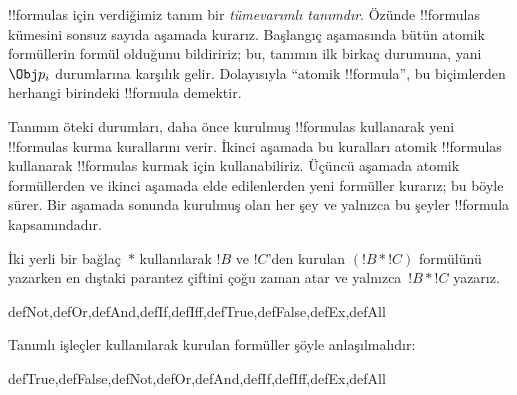 \documentclass[../../../include/open-logic-section]{subfiles}
\begin{document}
\begin{explain}
!!{formula}s için verdiğimiz tanım bir
\emph{tümevarımlı tanımdır}. Özünde !!{formula}s kümesini sonsuz sayıda
aşamada kurarız. Başlangıç aşamasında bütün atomik formüllerin formül
olduğunu bildiririz; bu, tanımın ilk birkaç durumuna, yani
%
%
$\Obj p_i$ durumlarına karşılık gelir. Dolayısıyla ``atomik !!{formula}'',
bu biçimlerden herhangi birindeki !!{formula} demektir.

Tanımın öteki durumları, daha önce kurulmuş !!{formula}s kullanarak yeni
!!{formula}s kurma kurallarını verir. İkinci aşamada bu kuralları atomik
!!{formula}s kullanarak !!{formula}s kurmak için kullanabiliriz. Üçüncü aşamada
atomik formüllerden ve ikinci aşamada elde edilenlerden yeni formüller
kurarız; bu böyle sürer. Bir aşamada sonunda kurulmuş olan her şey ve yalnızca
bu şeyler !!{formula} kapsamındadır.
\end{explain}

İki yerli bir bağlaç~$\ast$ kullanılarak $!B$ ve $!C$'den kurulan
$(!B \ast !C)$ formülünü yazarken en dıştaki parantez çiftini çoğu zaman
atar ve yalnızca~$!B \ast !C$ yazarız.

\begin{tagblock}{defNot,defOr,defAnd,defIf,defIff,defTrue,defFalse,defEx,defAll}
\begin{defn}
Tanımlı işleçler kullanılarak kurulan formüller şöyle anlaşılmalıdır:

\begin{tagenumerate}{defTrue,defFalse,defNot,defOr,defAnd,defIf,defIff,defEx,defAll}







\end{tagenumerate}
\end{defn}
\end{tagblock}
\end{document}
